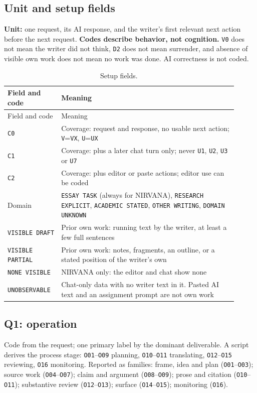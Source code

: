 \documentclass[manuscript,screen]{acmart}
\newcommand{\code}[1]{\texttt{#1}}
\begin{document}
\subsection{Unit and setup fields}

\textbf{Unit:} one request, its AI response, and the writer's first relevant next action before the next request. \textbf{Codes describe behavior, not cognition.} \code{V0} does not mean the writer did not think, \code{D2} does not mean surrender, and absence of visible own work does not mean no work was done. AI correctness is not coded.

\begin{longtable}{p{0.2\linewidth}p{0.71\linewidth}}
\caption{Setup fields.}\\
\toprule
Field and code & Meaning \\
\midrule
\endfirsthead
\toprule
Field and code & Meaning \\
\midrule
\endhead
\code{C0} & Coverage: request and response, no usable next action; \code{V}=\code{VX}, \code{U}=\code{UX} \\
\code{C1} & Coverage: plus a later chat turn only; never \code{U1}, \code{U2}, \code{U3} or \code{U7} \\
\code{C2} & Coverage: plus editor or paste actions; editor use can be coded \\
Domain & \code{ESSAY TASK} (always for NIRVANA), \code{RESEARCH EXPLICIT}, \code{ACADEMIC STATED}, \code{OTHER WRITING}, \code{DOMAIN UNKNOWN} \\
\code{VISIBLE DRAFT} & Prior own work: running text by the writer, at least a few full sentences \\
\code{VISIBLE PARTIAL} & Prior own work: notes, fragments, an outline, or a stated position of the writer's own \\
\code{NONE VISIBLE} & NIRVANA only: the editor and chat show none \\
\code{UNOBSERVABLE} & Chat-only data with no writer text in it. Pasted AI text and an assignment prompt are not own work \\
\bottomrule
\end{longtable}

\subsection{Q1: operation}

Code from the request; one primary label by the dominant deliverable. A script derives the process stage: \code{O01}--\code{O09} planning, \code{O10}--\code{O11} translating, \code{O12}--\code{O15} reviewing, \code{O16} monitoring. Reported as families: frame, idea and plan (\code{O01}--\code{O03}); source work (\code{O04}--\code{O07}); claim and argument (\code{O08}--\code{O09}); prose and citation (\code{O10}--\code{O11}); substantive review (\code{O12}--\code{O13}); surface (\code{O14}--\code{O15}); monitoring (\code{O16}).
\end{document}
